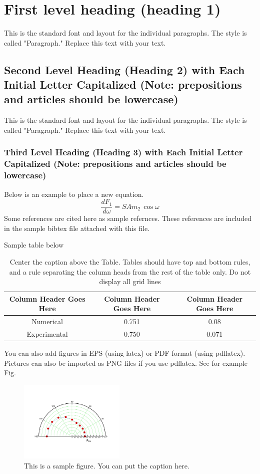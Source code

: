 \documentclass[a4paper,10pt]{ica2013_2}
\begin{document}
\section{First level heading (heading 1)}
This is the standard font and layout for the individual paragraphs.  The style is called "Paragraph."  Replace this text with your text.
\subsection{Second Level Heading (Heading 2) with Each Initial Letter Capitalized (Note: 
prepositions and articles should be lowercase)}
This is the standard font and layout for the individual paragraphs.  The style is called "Paragraph."  Replace this text with your text.
\subsubsection{Third Level Heading (Heading 3) with Each Initial Letter Capitalized (Note: prepositions and articles should be lowercase)}
Below is an example to place a new equation.
\begin{equation}
 \frac{d F_1}{d\omega}=SAm_2\,\cos \omega
\end{equation}
Some references \cite{bacon2000hot,hamilton1837third, kulvait2012nonlinear} are cited here as sample refernces. These references are included in the sample bibtex file attached with this file.

Sample table below
\begin{table}[!h]
\centering
\caption{Center the caption above the Table.  Tables should have top and bottom 
rules, and a rule separating the column heads from the rest of the table only.  Do not display all grid lines}\label{table:aerodynamic_results}
 \begin{tabular}{ccc}
\hline
\textbf{Column Header Goes Here} & \textbf{Column Header Goes Here}  & \textbf{Column Header Goes Here}\\
\hline
Numerical  & 0.751  & 0.08\\
Experimental & 0.750 & 0.071\\
\hline
 \end{tabular}
\end{table}

You can also add figures in EPS (using latex) or PDF format (using pdflatex). Pictures can also be imported as PNG files if you use pdflatex. See for example Fig.~
\begin{figure}[!h]
\centering
\includegraphics[width=0.45\textwidth]{sample_fig.pdf}
\caption{This is a sample figure. You can put the caption here.}\label{fig:sample_fig}
\end{figure}
\end{document}
